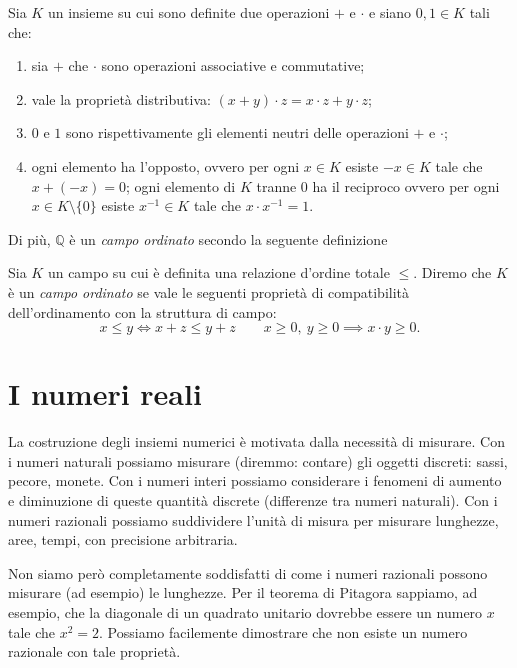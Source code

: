 \documentclass[italian,a4paper,hidelinks,headinclude]{scrartcl}
\newcommand{\QQ}{{\mathbb Q}}
\newcommand{\myemph}[1]{\emph{#1}\marginpar{#1}}
\begin{document}
\begin{definition}[campo]
  Sia $K$ un insieme su cui sono definite due operazioni $+$ e $\cdot$
  e siano $0,1 \in K$ tali che:
  \begin{enumerate}
    \item sia $+$ che $\cdot$ sono operazioni associative e commutative;
    \item vale la proprietà distributiva: $(x+y)\cdot z = x\cdot z + y\cdot z$;
    \item $0$ e $1$ sono rispettivamente gli elementi neutri delle operazioni $+$ e $\cdot$;
    \item ogni elemento ha l'opposto, ovvero per ogni $x\in K$ esiste $-x\in K$
    tale che $x+(-x) = 0$; ogni elemento di $K$ tranne $0$ ha il reciproco
    ovvero per ogni $x\in K\setminus\{0\}$ esiste $x^{-1}\in K$ tale che
    $x\cdot x^{-1}=1$.
  \end{enumerate}
\end{definition}

Di più, $\QQ$ è un \emph{campo ordinato} secondo la seguente definizione
\begin{definition}
  Sia $K$ un campo su cui è definita una relazione d'ordine totale $\le$.
  Diremo che $K$ è un \myemph{campo ordinato} se vale le seguenti
  proprietà di compatibilità dell'ordinamento con la struttura di campo:
  \[
    x \le y \iff x+z \le y+z \qquad
    x\ge 0,\ y \ge 0 \implies x\cdot y \ge 0.
  \]
\end{definition}

\section{I numeri reali}

La costruzione degli insiemi numerici è motivata dalla necessità di misurare.
Con i numeri naturali possiamo misurare (diremmo: contare) gli oggetti discreti:
sassi, pecore, monete. Con i numeri interi possiamo considerare i fenomeni di
aumento e diminuzione di queste quantità discrete (differenze tra numeri naturali).
Con i numeri razionali possiamo suddividere l'unità di misura per misurare
lunghezze, aree, tempi, con precisione arbitraria.

Non siamo però completamente soddisfatti di come i numeri razionali possono
misurare (ad esempio) le lunghezze. Per il teorema di Pitagora sappiamo,
ad esempio, che la diagonale di un quadrato unitario dovrebbe essere
un numero $x$ tale che $x^2=2$.
Possiamo facilemente dimostrare che non esiste un numero razionale
con tale proprietà.
\end{document}
